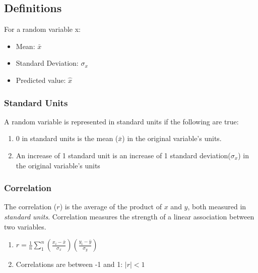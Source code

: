 \documentclass[
  letterpaper,
  DIV=11,
  numbers=noendperiod]{scrreprt}
\providecommand{\tightlist}{%
  \setlength{\itemsep}{0pt}\setlength{\parskip}{0pt}}\usepackage{longtable,booktabs,array}
\begin{document}
\hypertarget{definitions}{%
\subsection{Definitions}\label{definitions}}

For a random variable x:

\begin{itemize}
\tightlist
\item
  Mean: \(\bar{x}\)
\item
  Standard Deviation: \(\sigma_x\)
\item
  Predicted value: \(\hat{x}\)
\end{itemize}

\hypertarget{standard-units}{%
\subsubsection{Standard Units}\label{standard-units}}

A random variable is represented in standard units if the following are
true:

\begin{enumerate}
\def\labelenumi{\arabic{enumi}.}
\tightlist
\item
  0 in standard units is the mean (\(\bar{x}\)) in the original
  variable's units.
\item
  An increase of 1 standard unit is an increase of 1 standard
  deviation(\(\sigma_x\)) in the original variable's units
\end{enumerate}

\hypertarget{correlation}{%
\subsubsection{Correlation}\label{correlation}}

The correlation (\(r\)) is the average of the product of \(x\) and
\(y\), both measured in \emph{standard units}. Correlation measures the
strength of a linear association between two variables.

\begin{enumerate}
\def\labelenumi{\arabic{enumi}.}
\tightlist
\item
  \(r = \frac{1}{n} \sum_1^n (\frac{x_i - \bar{x}}{\sigma_x})(\frac{y_i - \bar{y}}{\sigma_y})\)
\item
  Correlations are between -1 and 1: \(|r| < 1\)
\end{enumerate}
\end{document}
